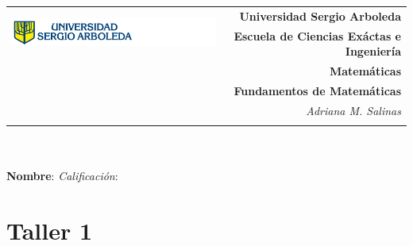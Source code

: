 \documentclass[12pt,letterpaper]{exam}
\newcommand{\base}[1]{\underline{\hspace{#1}}}
\newcommand{\uni}{Universidad Sergio Arboleda}
\newcommand{\fac}{\normalsize{Escuela de Ciencias Exáctas e Ingeniería}}
\newcommand{\dep}{Matemáticas}
\newcommand{\mat}{Fundamentos de  Matem\'aticas} %
\newcommand{\tema}{} %
\newcommand{\autor}{Adriana M. Salinas}
\begin{document}
\begin{tabular}{lr}
    \multirow{2}{*}{\includegraphics[height=1.4cm]{logosergio.png}} &
    {\textbf{\uni}} \\
    & {\textbf{\fac}} \\
    & {\textbf{\dep}} \\
    & {\textbf{\mat \tema}} \\
    & {\textit{\autor}} \\
    & {\textit{}}
\end{tabular}\\
\base{19.5cm}\\
\textbf{Nombre}:  \quad 
\textit{Calificación}: \base{2cm} \\[6pt]
\section*{Taller 1}
\end{document}
